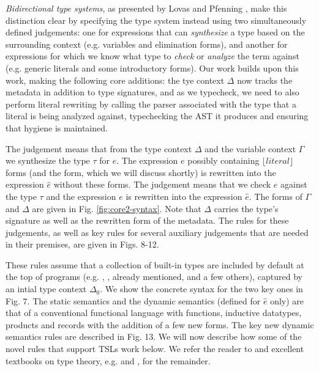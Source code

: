 \emph{Bidirectional type systems}, as presented by Lovas and Pfenning \cite{Lovas08abidirectional}, make this distinction clear by specifying the type system instead using two simultaneously defined judgements: one for expressions that can \emph{synthesize} a type based on the surrounding context (e.g. variables and elimination forms), and another for expressions for which we know what type to \emph{check} or \emph{analyze} the term against (e.g. generic literals and some introductory forms). 
Our work builds upon this work, making the following core additions: the tye context $\Delta$ now tracks the metadata in addition to type signatures, and as we typecheck, we need to also perform literal rewriting by calling the parser associated with the type that a literal is being analyzed against, typechecking the AST it produces and ensuring that hygiene is maintained.

The judgement 
means that from the type context $\Delta$ and the variable context $\Gamma$ we synthesize the type $\tau$ for $e$. The  expression $e$ possibly containing $\lfloor literal \rfloor$ forms (and the  form, which we will discuss shortly) is rewritten into the expression $\hat{e}$ without these forms.
The judgement 
means that we check $e$ against the type $\tau$ and the expression $e$ is rewritten into the expression $\hat{e}$. The forms of $\Gamma$ and $\Delta$ are given in Fig. \ref{fig:core2-syntax}. Note that $\Delta$ carries the type's signature as well as the rewritten form of the metadata. The rules for these judgements, as well as key rules for several auxiliary judgements that are needed in their premises, are given in Figs. 8-12. 

These rules assume that a collection of built-in types are included by default at the top of programs (e.g. , ,  already mentioned, and a few others), captured by an intial type context $\Delta_0$. We show the concrete syntax for the two key ones in Fig. 7. The static semantics and the dynamic semantics (defined for $\hat{e}$ only) are that of a conventional functional language with functions, inductive datatypes, products and records  with the addition of a few new forms. The key new dynamic semantics rules are described in Fig. 13. We will now describe how some of the novel rules that support TSLs work below. We refer the reader to \cite{Lovas08abidirectional} and excellent textbooks on type theory, e.g. \cite{pfpl} and \cite{tapl}, for the remainder.

